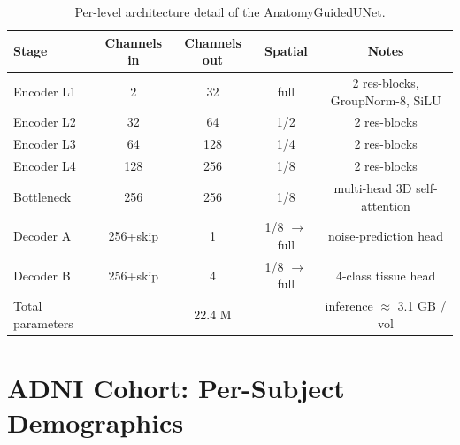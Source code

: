 \documentclass[10pt,a4paper]{article}
\begin{document}
\begin{table}[!ht]
\caption{Per-level architecture detail of the AnatomyGuidedUNet.}
\centering
\small
\begin{tabular}{lcccc}
\toprule
Stage & Channels in & Channels out & Spatial & Notes \\
\midrule
Encoder L1 & 2     & 32   & full & 2 res-blocks, GroupNorm-8, SiLU \\
Encoder L2 & 32    & 64   & 1/2  & 2 res-blocks \\
Encoder L3 & 64    & 128  & 1/4  & 2 res-blocks \\
Encoder L4 & 128   & 256  & 1/8  & 2 res-blocks \\
Bottleneck & 256   & 256  & 1/8  & multi-head 3D self-attention \\
Decoder A  & 256+skip & 1 & 1/8 $\to$ full & noise-prediction head \\
Decoder B  & 256+skip & 4 & 1/8 $\to$ full & 4-class tissue head \\
\midrule
Total parameters &        & 22.4 M  &       & inference $\approx$ 3.1 GB / vol \\
\bottomrule
\end{tabular}
\end{table}

\section{ADNI Cohort: Per-Subject Demographics}
\end{document}
